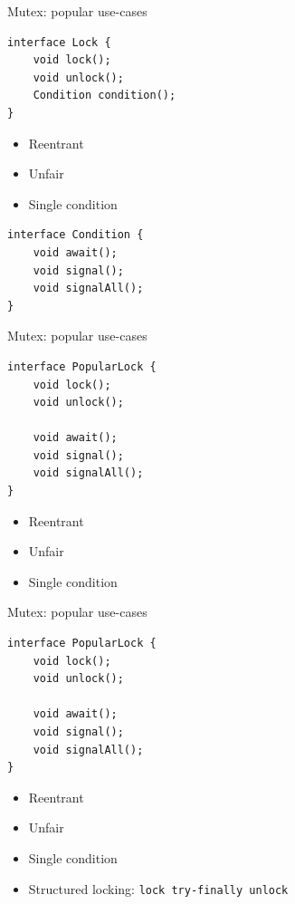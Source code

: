 
\begin{frame}{Mutex: popular use-cases}

\begin{verbatim}
interface Lock {
    void lock();
    void unlock();
    Condition condition();
}
\end{verbatim}

\begin{itemize}
    \item Reentrant
    \item Unfair
    \item Single condition
\end{itemize}

\begin{verbatim}
interface Condition {
    void await();
    void signal();
    void signalAll();
}
\end{verbatim}
\end{frame}

\begin{frame}{Mutex: popular use-cases}

\begin{verbatim}
interface PopularLock {
    void lock();
    void unlock();

    void await();
    void signal();
    void signalAll();
}
\end{verbatim}

\begin{itemize}
    \item Reentrant
    \item Unfair
    \item Single condition
\end{itemize}
\end{frame}


\begin{frame}{Mutex: popular use-cases}

\begin{verbatim}
interface PopularLock {
    void lock();
    void unlock();

    void await();
    void signal();
    void signalAll();
}
\end{verbatim}

\begin{itemize}
    \item Reentrant
    \item Unfair
    \item Single condition
    \item Structured locking: \texttt{lock try-finally unlock}
\end{itemize}
\end{frame}

